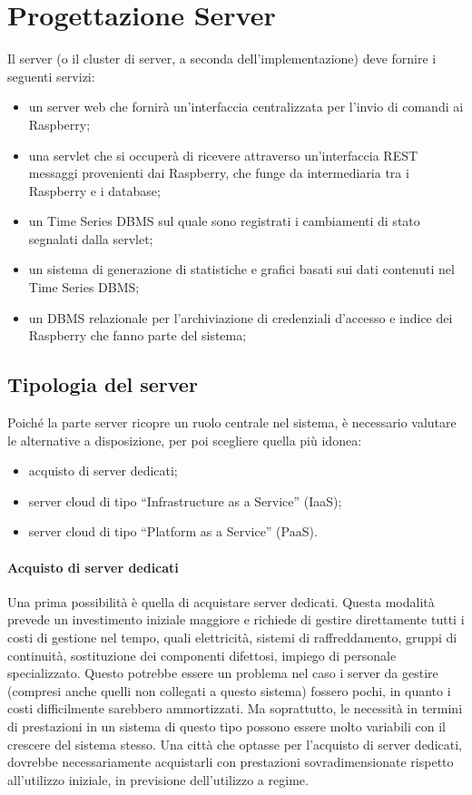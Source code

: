 \section{Progettazione Server}
Il server (o il cluster di server, a seconda dell'implementazione) deve fornire i seguenti servizi:
\begin{itemize}
 \item un server web che fornirà un'interfaccia centralizzata per l'invio di comandi ai Raspberry;
 \item una servlet che si occuperà di ricevere attraverso un'interfaccia REST messaggi provenienti dai Raspberry, che funge da intermediaria tra i Raspberry e i database;
 \item un Time Series DBMS sul quale sono registrati i cambiamenti di stato segnalati dalla servlet;
 \item un sistema di generazione di statistiche e grafici basati sui dati contenuti nel Time Series DBMS;
 \item un DBMS relazionale per l'archiviazione di credenziali d'accesso e indice dei Raspberry che fanno parte del sistema;
\end{itemize}

\subsection{Tipologia del server}
Poiché la parte server ricopre un ruolo centrale nel sistema, è necessario valutare le alternative a disposizione, per poi scegliere quella più idonea:
\begin{itemize}
 \item acquisto di server dedicati;
 \item server cloud di tipo ``Infrastructure as a Service'' (IaaS);
 \item server cloud di tipo ``Platform as a Service'' (PaaS).
\end{itemize}
\paragraph{Acquisto di server dedicati}
Una prima possibilità è quella di acquistare server dedicati.
Questa modalità prevede un investimento iniziale maggiore e richiede di gestire direttamente tutti i costi di gestione nel tempo, quali elettricità, sistemi di raffreddamento, gruppi di continuità, sostituzione dei componenti difettosi, impiego di personale specializzato.
Questo potrebbe essere un problema nel caso i server da gestire (compresi anche quelli non collegati a questo sistema) fossero pochi, in quanto i costi difficilmente sarebbero ammortizzati.
Ma soprattutto, le necessità in termini di prestazioni in un sistema di questo tipo possono essere molto variabili con il crescere del sistema stesso.
Una città che optasse per l'acquisto di server dedicati, dovrebbe necessariamente acquistarli con prestazioni sovradimensionate rispetto all'utilizzo iniziale, in previsione dell'utilizzo a regime.
